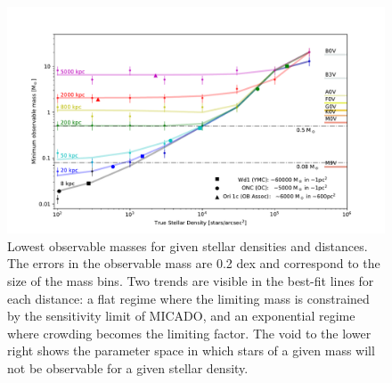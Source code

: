 \documentclass[referee]{aa}
\begin{document}
\begin{figure}

    \centering
    \includegraphics[width=\textwidth]{old_trusted_mass.pdf}

    \caption{Lowest observable masses for given stellar densities and distances.
    The errors in the observable mass are 0.2 dex and correspond to the size of the mass bins.
    Two trends are visible in the best-fit lines for each distance: a flat regime where the limiting mass is constrained by the sensitivity limit of MICADO, and an exponential regime where crowding becomes the limiting factor.
    The void to the lower right shows the parameter space in which stars of a given mass will not be observable for a given stellar density.
    }
    \label{fig:trusted_mass}
\end{figure}
\end{document}
